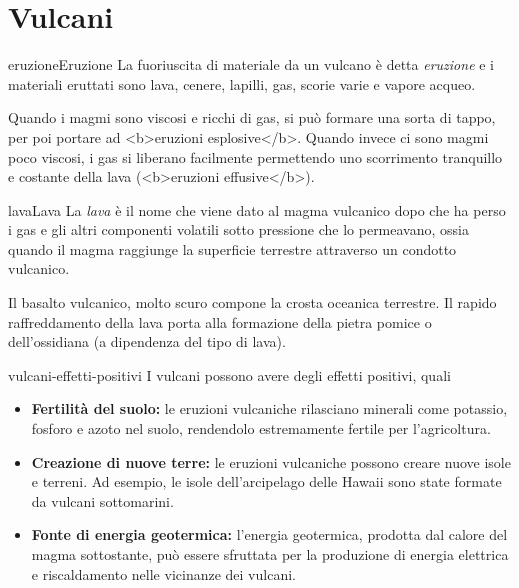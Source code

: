 \documentclass[preview]{standalone}
\begin{document}
\genpage

\section{Vulcani}

\begin{snippetdefinition}{eruzione}{Eruzione}
    La fuoriuscita di materiale da un vulcano è detta \textit{eruzione}
    e i materiali eruttati sono lava, cenere, lapilli, gas, scorie varie e vapore acqueo.
\end{snippetdefinition}

\begin{plainhtml}
    Quando i magmi sono viscosi e ricchi di gas, si può formare una sorta di tappo,
    per poi portare ad <b>eruzioni esplosive</b>.
    Quando invece ci sono magmi poco viscosi, i gas si liberano facilmente
    permettendo uno scorrimento tranquillo e costante della lava (<b>eruzioni effusive</b>).
\end{plainhtml}

\begin{snippetdefinition}{lava}{Lava}
    La \textit{lava} è il nome che viene dato al magma vulcanico
    dopo che ha perso i gas e gli altri componenti volatili sotto pressione che lo permeavano,
    ossia quando il magma raggiunge la superficie terrestre attraverso un condotto vulcanico.
\end{snippetdefinition}

\begin{plainhtml}
    Il basalto vulcanico, molto scuro compone la crosta oceanica terrestre.
    Il rapido raffreddamento della lava porta alla formazione della pietra pomice o dell'ossidiana
    (a dipendenza del tipo di lava).
\end{plainhtml}

\begin{snippet}{vulcani-effetti-positivi}
    I vulcani possono avere degli effetti positivi, quali
    \begin{itemize}
        \item \textbf{Fertilità del suolo:} le eruzioni vulcaniche rilasciano minerali come potassio,
            fosforo e azoto nel suolo, rendendolo estremamente fertile per l'agricoltura.
        \item \textbf{Creazione di nuove terre:} le eruzioni vulcaniche possono creare nuove isole
            e terreni. Ad esempio, le isole dell'arcipelago delle Hawaii sono state formate
            da vulcani sottomarini.
        \item \textbf{Fonte di energia geotermica:} l'energia geotermica, prodotta dal calore
            del magma sottostante, può essere sfruttata per la produzione
            di energia elettrica e riscaldamento nelle vicinanze dei vulcani.
    \end{itemize}
\end{snippet}
\end{document}
